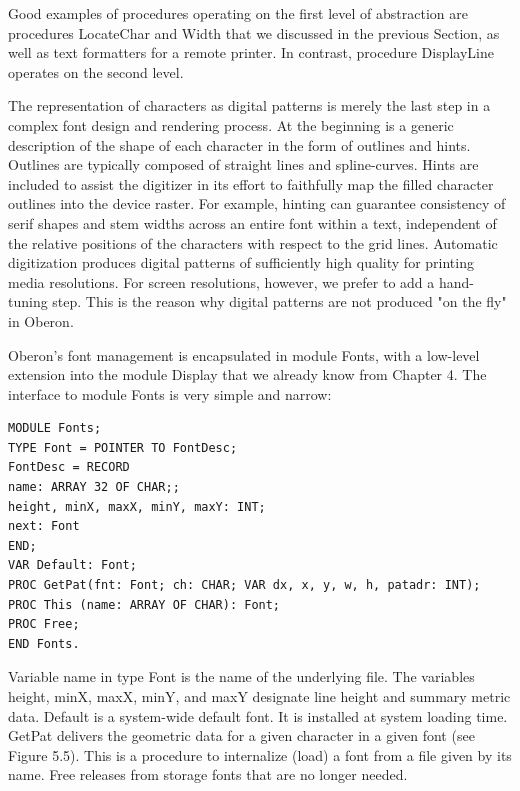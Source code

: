 Good examples of procedures operating on the first level of abstraction are procedures LocateChar
and Width that we discussed in the previous Section, as well as text formatters for a remote printer.
In contrast, procedure DisplayLine operates on the second level.

The representation of characters as digital patterns is merely the last step in a complex font design
and rendering process. At the beginning is a generic description of the shape of each character in
the form of outlines and hints. Outlines are typically composed of straight lines and spline-curves.
Hints are included to assist the digitizer in its effort to faithfully map the filled character outlines into
the device raster. For example, hinting can guarantee consistency of serif shapes and stem widths
across an entire font within a text, independent of the relative positions of the characters with
respect to the grid lines. Automatic digitization produces digital patterns of sufficiently high quality
for printing media resolutions. For screen resolutions, however, we prefer to add a hand-tuning
step. This is the reason why digital patterns are not produced "on the fly" in Oberon.

Oberon's font management is encapsulated in module Fonts, with a low-level extension into the
module Display that we already know from Chapter 4. The interface to module Fonts is very simple
and narrow:
\begin{verbatim}
MODULE Fonts;
TYPE Font = POINTER TO FontDesc;
FontDesc = RECORD
name: ARRAY 32 OF CHAR;;
height, minX, maxX, minY, maxY: INT;
next: Font
END;
VAR Default: Font;
PROC GetPat(fnt: Font; ch: CHAR; VAR dx, x, y, w, h, patadr: INT);
PROC This (name: ARRAY OF CHAR): Font;
PROC Free;
END Fonts.
\end{verbatim}

Variable name in type Font is the name of the underlying file. The variables height, minX, maxX,
minY, and maxY designate line height and summary metric data. Default is a system-wide default
font. It is installed at system loading time. GetPat delivers the geometric data for a given character
in a given font (see Figure 5.5). This is a procedure to internalize (load) a font from a file given by
its name. Free releases from storage fonts that are no longer needed.

